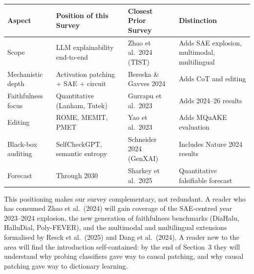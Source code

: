 {\def\LTcaptype{none} %
\begin{longtable}[]{@{}
  >{\raggedright\arraybackslash}p{}
  >{\raggedright\arraybackslash}p{}
  >{\raggedright\arraybackslash}p{}
  >{\raggedright\arraybackslash}p{}@{}}
\toprule\noalign{}
\begin{minipage}[b]{\linewidth}\raggedright
Aspect
\end{minipage} & \begin{minipage}[b]{\linewidth}\raggedright
Position of this Survey
\end{minipage} & \begin{minipage}[b]{\linewidth}\raggedright
Closest Prior Survey
\end{minipage} & \begin{minipage}[b]{\linewidth}\raggedright
Distinction
\end{minipage} \\
\midrule\noalign{}
\endhead
\bottomrule\noalign{}
\endlastfoot
Scope & LLM explainability end-to-end & Zhao et al.~2024 (TIST) & Adds SAE explosion, multimodal, multilingual \\
Mechanistic depth & Activation patching + SAE + circuit & Bereska \& Gavves 2024 & Adds CoT and editing \\
Faithfulness focus & Quantitative (Lanham, Tutek) & Gurrapu et al.~2023 & Adds 2024--26 results \\
Editing & ROME, MEMIT, PMET & Yao et al.~2023 & Adds MQuAKE evaluation \\
Black-box auditing & SelfCheckGPT, semantic entropy & Schneider 2024 (GenXAI) & Includes Nature 2024 results \\
Forecast & Through 2030 & Sharkey et al.~2025 & Quantitative falsifiable forecast \\
\end{longtable}
}

This positioning makes our survey complementary, not redundant. A reader who has consumed Zhao et al.~(2024) will gain coverage of the SAE-centred year 2023--2024 explosion, the new generation of faithfulness benchmarks (DiaHalu, HalluDial, Poly-FEVER), and the multimodal and multilingual extensions formalised by Resck et al.~(2025) and Dang et al.~(2024). A reader new to the area will find the introduction self-contained: by the end of Section~3 they will understand why probing classifiers gave way to causal patching, and why causal patching gave way to dictionary learning.

